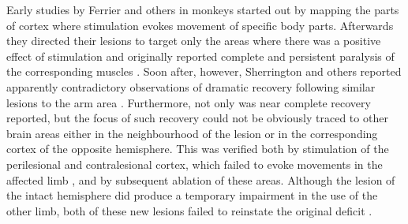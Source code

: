 Early studies by Ferrier and others in monkeys started out by mapping the parts of cortex where stimulation evokes movement of specific body parts. Afterwards they directed their lesions to target only the areas where there was a positive effect of stimulation and originally reported complete and persistent paralysis of the corresponding muscles \cite{Ferrier1884}. Soon after, however, Sherrington and others reported apparently contradictory observations of dramatic recovery following similar lesions to the arm area \cite{GrahamBrown1913,Leyton1917}. Furthermore, not only was near complete recovery reported, but the focus of such recovery could not be obviously traced to other brain areas either in the neighbourhood of the lesion or in the corresponding cortex of the opposite hemisphere. This was verified both by stimulation of the perilesional and contralesional cortex, which failed to evoke movements in the affected limb \cite{Leyton1917}, and by subsequent ablation of these areas. Although the lesion of the intact hemisphere did produce a temporary impairment in the use of the other limb, both of these new lesions failed to reinstate the original deficit \cite{GrahamBrown1913,Leyton1917}.


